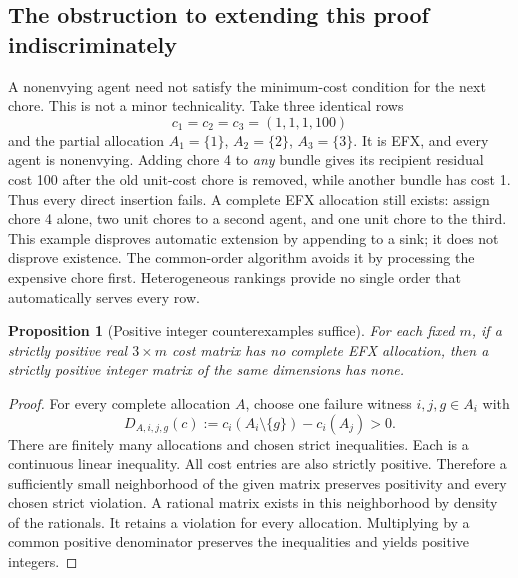 \documentclass[11pt,a4paper]{article}
\newtheorem{proposition}[theorem]{Proposition}
\theoremstyle{definition}\newtheorem{definition}[theorem]{Definition}
\theoremstyle{remark}\newtheorem{remark}[theorem]{Remark}
\newcommand{\1}{\mathbf 1}
\begin{document}
\subsection{The obstruction to extending this proof indiscriminately}
A nonenvying agent need not satisfy the minimum-cost condition for the next chore. This is not a minor technicality. Take three identical rows
\[
 c_1=c_2=c_3=(1,1,1,100)
\]
and the partial allocation $A_1=\{1\}$, $A_2=\{2\}$, $A_3=\{3\}$. It is EFX, and every agent is nonenvying. Adding chore 4 to \emph{any} bundle gives its recipient residual cost 100 after the old unit-cost chore is removed, while another bundle has cost 1. Thus every direct insertion fails. A complete EFX allocation still exists: assign chore 4 alone, two unit chores to a second agent, and one unit chore to the third. This example disproves automatic extension by appending to a sink; it does not disprove existence. The common-order algorithm avoids it by processing the expensive chore first. Heterogeneous rankings provide no single order that automatically serves every row.

\begin{proposition}[Positive integer counterexamples suffice]\label{prop:integer}
For each fixed $m$, if a strictly positive real $3\times m$ cost matrix has no complete EFX allocation, then a strictly positive integer matrix of the same dimensions has none.
\end{proposition}
\begin{proof}
For every complete allocation $A$, choose one failure witness $i,j,g\in A_i$ with
\[
 D_{A,i,j,g}(c):=c_i(A_i\setminus\{g\})-c_i(A_j)>0.
\]
There are finitely many allocations and chosen strict inequalities. Each is a continuous linear inequality. All cost entries are also strictly positive. Therefore a sufficiently small neighborhood of the given matrix preserves positivity and every chosen strict violation. A rational matrix exists in this neighborhood by density of the rationals. It retains a violation for every allocation. Multiplying by a common positive denominator preserves the inequalities and yields positive integers.
\end{proof}
\end{document}
